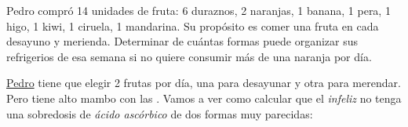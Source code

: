 \def\Pedro{\href{https://www.youtube.com/watch?v=RXKabdUBiWM}{Pedro}\xspace}

\begin{enunciado}{\ejercicio}
  Pedro compró 14 unidades de fruta: 6 duraznos, 2 naranjas, 1 banana, 1 pera, 1 higo, 1 kiwi, 1 ciruela, 1 mandarina.
  Su propósito es comer una fruta en cada desayuno y merienda. Determinar de cuántas formas puede organizar sus refrigerios de
  esa semana si no quiere consumir más de una naranja por día.
\end{enunciado}

\Pedro tiene que elegir 2 frutas por día, una para desayunar y otra para merendar.
Pero tiene alto mambo con las . Vamos a ver como calcular que el \textit{infeliz} no tenga una sobredosis de
\textit{ácido ascórbico} de dos formas muy parecidas:

